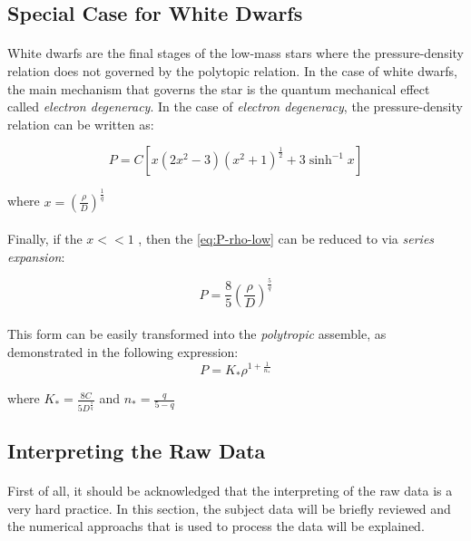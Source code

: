 \documentclass[letterpaper,12pt]{article}
\begin{document}
\subsection{Special Case for White Dwarfs}

\paragraph{} White dwarfs are the final stages of the low-mass stars where the pressure-density relation does not governed by the polytopic relation. In the case of white dwarfs, the main mechanism that governs the star is the quantum mechanical effect called \textit{electron degeneracy}. In the case of \textit{electron degeneracy}, the pressure-density relation can be written as:

\begin{equation}
    \label{eq:P-rho-low}
    P = C \left[x \left(2x^2-3\right)\left(x^2+1\right)^{\frac{1}{2}}+3\sinh^{-1}{x}\right]
\end{equation}

where $x = \left(\frac{\rho}{D}\right)^{\frac{1}{q}}$

\paragraph{} Finally, if the $x<<1$ , then the \eqref{eq:P-rho-low} can be reduced to via \textit{series expansion}:

\begin{equation*}
    P = \frac{8}{5} \left(\frac{\rho}{D}\right)^{\frac{5}{q}}
\end{equation*}

\paragraph{} This form can be easily transformed into the \textit{polytropic} assemble, as demonstrated in the following expression:
\begin{equation}
    \label{eq:P-rho-low-reduced}
    P = K_* \rho^{1 + \frac{1}{n_*}}
\end{equation}

where $K_* = \frac{8C}{5D^{\frac{5}{q}}}$ and $n_* = \frac{q}{5-q}$

\subsection{Interpreting the Raw Data}
\paragraph{} First of all, it should be acknowledged that the interpreting of the raw data is a very hard practice. In this section, the subject data will be briefly reviewed and the numerical approachs that is used to process the data will be explained.
\end{document}
